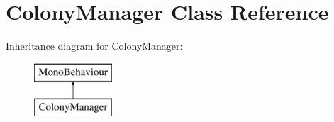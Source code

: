 \hypertarget{class_colony_manager}{}\section{Colony\+Manager Class Reference}
\label{class_colony_manager}
Inheritance diagram for Colony\+Manager\+:\begin{figure}[H]
\begin{center}
\leavevmode
\includegraphics[height=2.000000cm]{class_colony_manager}
\end{center}
\end{figure}
